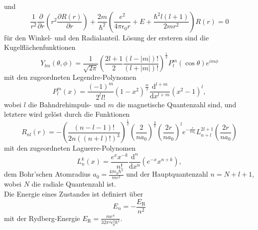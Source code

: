und
\begin{equation}
  \frac{1}{r^2} \frac{\partial}{\partial r} \left( r^2 \frac{\partial R\left( r\right)}{\partial r} \right) + \frac{2m}{\hbar^2} \left( \frac{e^2}{4\pi \epsilon_0 r} + E + \frac{\hbar^2 l \left( l + 1 \right)}{2m r^2} \right) R\left( r \right) = 0
  \label{eq:radial_qm}
\end{equation}
für den Winkel- und den Radialanteil.
Lösung der ersteren sind die Kugelflächenfunktionen
\begin{equation}
  Y_{lm} \left(\theta, \phi \right) = \frac{1}{\sqrt{2\pi}} \left( \frac{2l + 1}{2} \frac{\left(l - |m|\right)!}{\left(l + |m|\right)!} \right)^{\frac{1}{2}} P_l^{m} \left(\cos \theta \right) e^{im\phi}
  \label{eq:kugelflaechen}
\end{equation}
mit den zugeordneten Legendre-Polynomen
\begin{equation}
  P_l^{m} (x) = \frac{(-1)^m}{2^l l!} \left( 1 - x^2 \right)^{\frac{m}{2}} \frac{\mathrm{d}^{l+m}}{\mathrm{d} x^{l+m}} \left(x^2 - 1 \right)^l,
\end{equation}
wobei $l$ die Bahndrehimpuls- und $m$ die magnetische Quantenzahl sind,
und letztere wird gelöst durch die Funktionen
\begin{equation}
  R_{nl} (r) = - \left( \frac{\left( n - l - 1 \right)!}{2n\left(\left(n + l\right)!\right)^3} \right)^{\frac{1}{2}} \left( \frac{2}{na_0} \right)^{\frac{3}{2}} \left( \frac{2r}{na_0} \right)^{l} e^{-\frac{r}{n a_0}} L_{n+l}^{2l+1} \left( \frac{2r}{n a_0}\right)
\end{equation}
mit den zugeordneten Laguerre-Polynomen
\begin{equation}
  L_n^{k} (x) = \frac{e^x x^{-k}}{n!} \frac{\mathrm{d}^n}{\mathrm{d} x^n} \left( e^{-x} x^{n+k} \right),
\end{equation}
dem Bohr'schen Atomradius $a_0 = \frac{4\pi \epsilon_0 \hbar^2}{m e^2}$ und der Hauptquantenzahl $n = N + l + 1$, wobei $N$ die radiale Quantenzahl ist.\\
Die Energie eines Zustandes ist definiert über
\begin{equation}
  E_n = - \frac{E_\mathrm{R}}{n^2}
  \label{eq:eigenenergie}
\end{equation}
mit der Rydberg-Energie $E_\mathrm{R} = \frac{m e^4}{32\pi^2 \epsilon_0^{2}\hbar^2}$.

